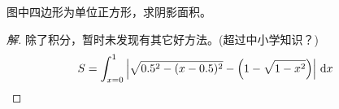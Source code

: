 \begin{example}
  图中四边形为单位正方形，求阴影面积。

  \centering
\end{example}
\begin{proof}[解]
  除了积分，暂时未发现有其它好方法。(超过中小学知识？)
  \begin{align*}
    S&=\int_{x=0}^1 \left| \sqrt{0.5^2 - (x-0.5)^2} - \left(1-\sqrt{1-x^2}\right)\right| \,\mathrm{d}x\qedhere
  \end{align*}

\end{proof}

